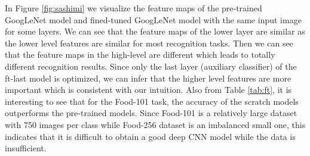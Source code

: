 In Figure \ref{fig:sashimi} we visualize the feature maps of the pre-trained GoogLeNet model and fined-tuned GoogLeNet model with the same input image for some layers. We can see that the feature maps of the lower layer are similar as the lower level features are similar for most recognition tasks.
Then we can see that the feature maps in the high-level are different which leads to totally different recognition results.
Since only the last layer (auxiliary classifier) of the ft-last model is optimized, we can infer that the higher level features are more important which is consistent with our intuition. Also from Table \ref{tab:ft}, it is interesting to see that for the Food-101 task, the accuracy of  the scratch models outperforms the pre-trained models. Since Food-101 is a relatively large dataset with 750 images per class while Food-256 dataset is an imbalanced small one, this indicates that it is difficult to obtain a good deep CNN model while the data is insufficient.

